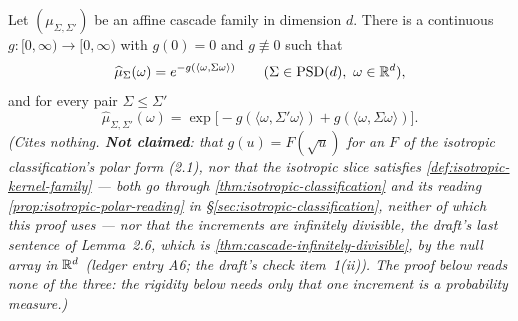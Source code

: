\begin{lemma}
\label{lem:affine-reduction}
\leanok
Let $(\mu_{\Sigma,\Sigma'})$ be an affine cascade family in dimension $d$. There is a continuous
$g : [0,\infty) \to [0,\infty)$ with $g(0) = 0$ and $g \not\equiv 0$ such that
\begin{equation}\label{eq:affine-reduction}
  \widehat\mu_\Sigma(\omega) = e^{-g(\langle\omega,\Sigma\omega\rangle)}
  \qquad (\Sigma \in \mathrm{PSD}(d),\ \omega \in \mathbb{R}^d),
\end{equation}
and for every pair $\Sigma \le \Sigma'$
\begin{equation}\label{eq:affine-increment}
  \widehat\mu_{\Sigma,\Sigma'}(\omega)
   = \exp\bigl[-g(\langle\omega,\Sigma'\omega\rangle) + g(\langle\omega,\Sigma\omega\rangle)\bigr] .
\end{equation}
\statusT\quad\emph{(Cites nothing. \textbf{Not claimed}: that $g(u) = F(\sqrt u)$ for an $F$ of
the isotropic classification's polar form (2.1), nor that the isotropic slice satisfies
\ref{def:isotropic-kernel-family} --- both go through \ref{thm:isotropic-classification} and its
reading \ref{prop:isotropic-polar-reading} in \S\ref{sec:isotropic-classification}, neither of
which this proof uses --- nor that the increments are infinitely divisible, the draft's last
sentence of Lemma~2.6, which is \ref{thm:cascade-infinitely-divisible}, by the null array in $\mathbb{R}^d$
(ledger entry A6; the draft's check item~1(ii)). The proof below reads none of the three: the rigidity
below needs only that one increment is a probability measure.)}
\end{lemma}

